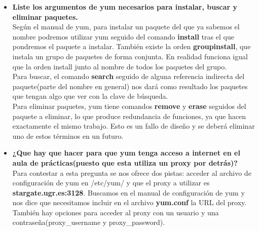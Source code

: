 \begin{itemize}
	\item \textbf{Liste los argumentos de yum necesarios para instalar, buscar y eliminar paquetes.}\\
	Según el manual de yum\cite{yum}, para instalar un paquete del que ya sabemos el nombre podremos utilizar yum seguido del comando \textbf{install} tras el que pondremos el paquete a instalar. También existe la orden \textbf{groupinstall}, que instala un grupo de paquetes de forma conjunta. En realidad funciona igual que la orden install junto al nombre de todos los paquetes del grupo.\\
	
	Para buscar, el comando \textbf{search} seguido de alguna referencia indirecta del paquete(parte del nombre en general) nos dará como resultado los paquetes que tengan algo que ver con la clave de búsqueda.\\
	
	Para eliminar paquetes, yum tiene comandos \textbf{remove} y \textbf{erase} seguidos del paquete a eliminar, lo que produce redundancia de funciones, ya que hacen exactamente el mismo trabajo. Esto es un fallo de diseño y se deberá eliminar uno de estos términos en un futuro.\\
	
	\item \textbf{¿Que hay que hacer para que yum tenga acceso a internet en el aula de prácticas(puesto que esta utiliza un proxy por detrás)?}\\
	
	Para contestar a esta pregunta se nos ofrece dos pistas: acceder al archivo de configuración de yum en /etc/yum/ y que el proxy a utilizar es \textbf{stargate.ugr.es:3128}. Buscamos en el manual de configuración de yum\cite{yum.conf} y nos dice que necesitamos incluir en el archivo \textbf{yum.conf} la URL del proxy. También hay opciones para acceder al proxy con un usuario y una contraseña(proxy\_username y proxy\_password).
	
\end{itemize}

